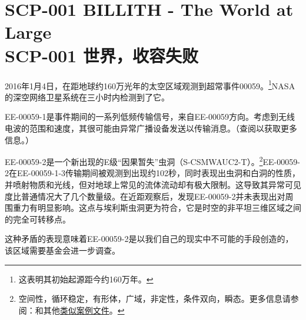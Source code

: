 \chapter[SCP-001 世界，收容失败]{
    SCP-001 BILLITH - The World at Large \\
    SCP-001 世界，收容失败
}

\label{chap:SCP-001.the.world.at.large}

\begin{scpbox}

\begin{center}




\end{center}

\end{scpbox}

\begin{scpbox}




2016年1月4日，在距地球约160万光年的太空区域观测到超常事件00059。\footnote{这表明其初始起源距今约160万年。}NASA的深空网络卫星系统在三小时内检测到了它。

EE-00059-1是事件期间的一系列低频传输信号，来自EE-00059方向。考虑到无线电波的范围和速度，其很可能由异常广播设备发送以传输消息。（查阅以获取更多信息。）

EE-00059-2是一个新出现的E级“因果暂失”虫洞（S-CSMWAUC2-T）。\footnote{空间性，循环稳定，有形体，广域，非定性，条件双向，瞬态。更多信息请参阅：和其他\hyperref[chap:SCP-3989]{类似案例文件}。}EE-00059-2在EE-00059-1-3传输期间被观测到出现约102秒，同时表现出虫洞和白洞的性质，并喷射物质和光线，但对地球上常见的流体流动却有极大限制。这导致其异常可见度比普通情况大了几个数量级。在近距观察后，发现EE-00059-2并未表现出对周围重力有明显影响。这点与埃利斯虫洞更为符合，它是时空的非平坦三维区域之间的完全可转移点。

这种矛盾的表现意味着EE-00059-2是以我们自己的现实中不可能的手段创造的，该区域需要基金会进一步调查。

\end{scpbox}

